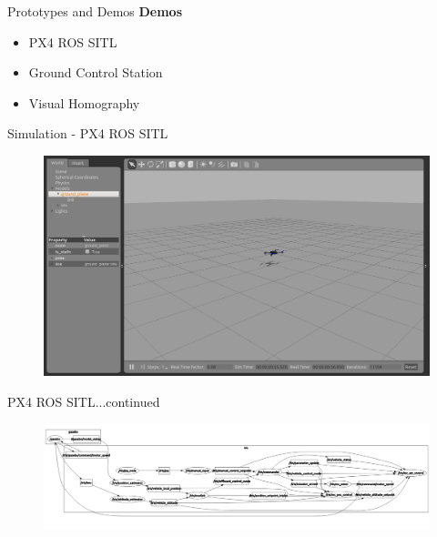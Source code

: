 \documentclass[11pt]{beamer}
\begin{document}
\begin{frame}{Prototypes and Demos}
\large{\textbf{Demos}}
\begin{itemize}
	\item PX4 ROS SITL
	\item Ground Control Station
	\item Visual Homography
\end{itemize}

\end{frame}




\begin{frame}{Simulation - PX4 ROS SITL}
\begin{figure}
\includegraphics[width=1\textwidth]{images/flight1}
\end{figure}
\end{frame}

\begin{frame}{PX4 ROS SITL...continued}
\begin{figure}
\includegraphics[width=1\textwidth]{images/px4graph}
\end{figure}
\end{frame}
\end{document}
